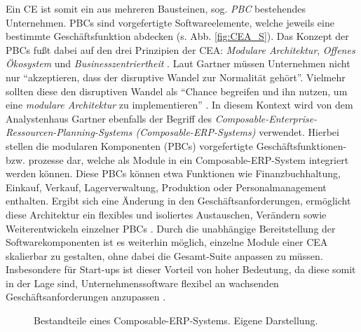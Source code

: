 Ein CE ist somit ein aus mehreren Bausteinen, sog. \textit{\ac{PBC}} bestehendes Unternehmen. PBCs sind vorgefertigte Softwareelemente, welche jeweils eine bestimmte Geschäftsfunktion abdecken (s. Abb. \ref{fig:CEA_S}). Das Konzept der PBCs fußt dabei auf den drei Prinzipien der CEA: \textit{Modulare Architektur}, \textit{Offenes Ökosystem} und \textit{Businesszentriertheit} \cite{.20230313}. Laut Gartner müssen Unternehmen nicht nur \enquote{akzeptieren, dass der disruptive Wandel zur Normalität gehört}. Vielmehr sollten diese den disruptiven Wandel als \enquote{Chance begreifen und ihn nutzen, um eine \textit{modulare Architektur} zu implementieren} \cite{.20230313}. In diesem Kontext wird von dem Analystenhaus Gartner ebenfalls der Begriff des \textit{Composable-Enterprise-Ressourcen-Planning-Systems (Composable-\acs{ERP}-Systems)} verwendet. Hierbei stellen die modularen Komponenten (PBCs) vorgefertigte Geschäftsfunktionen- bzw. prozesse dar, welche als Module in ein Composable-ERP-System integriert werden können. Diese PBCs können etwa Funktionen wie Finanzbuchhaltung, Einkauf, Verkauf, Lagerverwaltung, Produktion oder Personalmanagement enthalten. Ergibt sich eine Änderung in den Geschäftsanforderungen, ermöglicht diese Architektur ein flexibles und isoliertes Austauschen, Verändern sowie Weiterentwickeln einzelner PBCs \cite{Gartner.20230418}. Durch die unabhängige Bereitstellung der Softwarekomponenten ist es weiterhin möglich, einzelne Module einer CEA skalierbar zu gestalten, ohne dabei die Gesamt-Suite anpassen zu müssen. Insbesondere für Start-ups ist dieser Vorteil von hoher Bedeutung, da diese somit in der Lage sind, Unternehmenssoftware flexibel an wachsenden Geschäftsanforderungen anzupassen \cite[7]{Sensedia.2020}.  
\begin{center}
	\begin{figure}[H]
		\centering
		\caption[Bestandteile eines Composable-ERP-Systems]{Bestandteile eines Composable-ERP-Systems. Eigene Darstellung.}
		\label{fig:CERP}
	\end{figure}	
\end{center}
\vspace*{-15mm}
